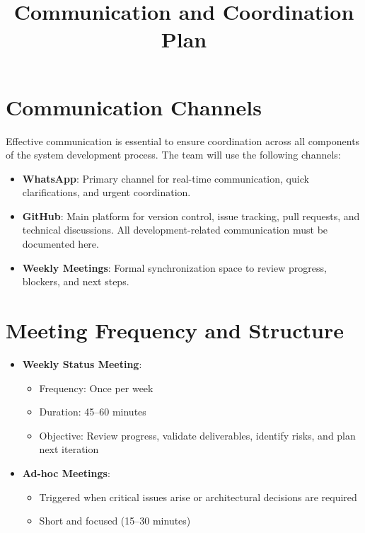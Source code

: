 \documentclass[12pt]{article}
\title{Communication and Coordination Plan}
\author{}
\date{}
\begin{document}
\maketitle

\section{Communication Channels}

Effective communication is essential to ensure coordination across all components of the system development process. The team will use the following channels:

\begin{itemize}
    \item \textbf{WhatsApp}: Primary channel for real-time communication, quick clarifications, and urgent coordination.
    
    \item \textbf{GitHub}: Main platform for version control, issue tracking, pull requests, and technical discussions. All development-related communication must be documented here.
    
    \item \textbf{Weekly Meetings}: Formal synchronization space to review progress, blockers, and next steps.
\end{itemize}

\section{Meeting Frequency and Structure}

\begin{itemize}
    \item \textbf{Weekly Status Meeting}:
    \begin{itemize}
        \item Frequency: Once per week
        \item Duration: 45–60 minutes
        \item Objective: Review progress, validate deliverables, identify risks, and plan next iteration
    \end{itemize}
    
    \item \textbf{Ad-hoc Meetings}:
    \begin{itemize}
        \item Triggered when critical issues arise or architectural decisions are required
        \item Short and focused (15–30 minutes)
    \end{itemize}
\end{itemize}
\end{document}
